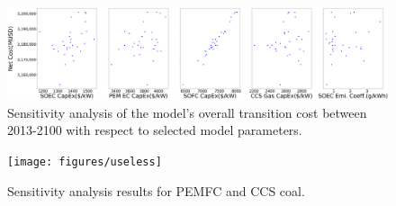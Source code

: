 \begin{figure}[H] 
\centering
\includegraphics[scale=0.15]{figures/syscost}
\caption{Sensitivity analysis of the model's overall transition cost between 2013-2100 with respect to selected model parameters.}
\label{syscost}
\end{figure}

\begin{figure}[h] 
\centering
\hspace*{-3cm}
\texttt{[image: figures/useless]}
\caption{Sensitivity analysis results for \gls{PEMFC} and \gls{CCS} coal.}
\label{sa-useless}

\end{figure}